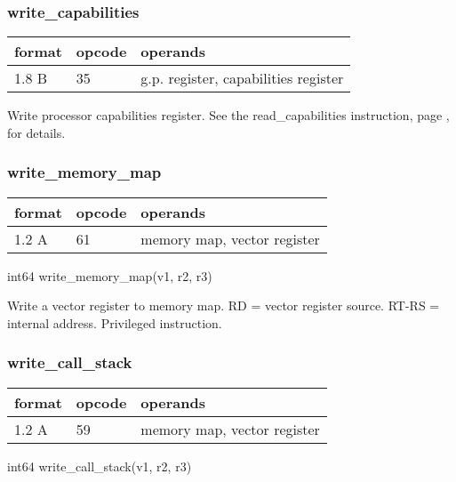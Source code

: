 \documentclass[forwardcom.tex]{subfiles}
\begin{document}
\subsubsection{write\_capabilities}
\label{table:writeCapabilitiesInstruction}
\begin{tabular}{|p{12mm}|p{12mm}|p{110mm}|}
\hline
\bfseries format & \bfseries opcode & \bfseries operands \\ \hline
1.8 B & 35 & g.p. register, capabilities register \\ \hline
\end{tabular}
\vspace{2mm}

Write processor capabilities register. See the read\_capabilities instruction, page \pageref{table:readCapabilitiesInstruction}, for details.

\subsubsection{write\_memory\_map}
\label{table:writeMemoryMapInstruction}\begin{tabular}{|p{12mm}|p{12mm}|p{110mm}|}
\hline
\bfseries format & \bfseries opcode & \bfseries operands \\ \hline
1.2 A & 61 & memory map, vector register \\ \hline
\end{tabular}
\vspace{2mm}

int64 write\_memory\_map(v1, r2, r3)
\vspace{2mm}

Write a vector register to memory map. RD = vector register source. RT-RS = internal address. Privileged instruction.
\vspace{2mm}

\subsubsection{write\_call\_stack}
\label{table:writeCallStackInstruction}\begin{tabular}{|p{12mm}|p{12mm}|p{110mm}|}
\hline
\bfseries format & \bfseries opcode & \bfseries operands \\ \hline
1.2 A & 59 & memory map, vector register \\ \hline
\end{tabular}
\vspace{2mm}

int64 write\_call\_stack(v1, r2, r3)
\vspace{2mm}
\end{document}
